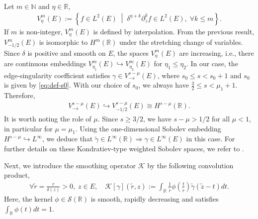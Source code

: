 ﻿\documentclass[11pt,reqno,oneside]{amsart}
\theoremstyle{definition}
\theoremstyle{remark}
\newcommand{\setdef}[2]{\left\lbrace {#1} \; \middle| \; {#2} \right\rbrace}
\newcommand{\R}{\mathbb{R}}
\newcommand{\N}{\mathbb{N}}
\newcommand{\Sw}{\mathcal{S}}
\renewcommand{\d}{\delta}
\newcommand{\g}{\gamma}
\newcommand{\vf}{\varphi}
\newcommand{\p}{\partial}
\newcommand{\ds}{\displaystyle}
\begin{document}
        Let $m\in\N$ and $\eta\in\R$,
        \begin{align*}
            V_{\eta}^m(E):=\setdef{f\in L^2(E)}{\d^{\eta+k}\p_z^k f \in L^2(E), \; \forall k\leq m}.
        \end{align*}
        If $m$ is non-integer, $V_{\eta}^m(E)$ is defined by interpolation. From the previous result, $V^m_{-1/2}(E)$ is isomorphic to $H^m(\R)$ under the stretching change of variables. Since $\d$ is positive and smooth on $E$, the spaces $V_{\eta}^m(E)$ are increasing, i.e., there are continuous embeddings $V_{\eta_1}^m(E)\hookrightarrow V_{\eta_2}^m(E)$ for $\eta_1\leq \eta_2$. In our case, the edge-singularity coefficient satisfies $\g\in V_{-s}^{s-\mu}(E)$, where $s_0\leq s <s_0+1$ and $s_0$ is given by \eqref{eq:def-s0}. With our choice of $s_0$, we always have $\frac{3}{2}\leq s < \mu_1+1$. Therefore,
        \begin{align}\label{eq:embedding-weighted}
                V_{-s}^{s-\mu}(E)\hookrightarrow V_{-1/2}^{s-\mu}(E) \cong H^{s-\mu}(\R).
        \end{align}
         It is worth noting the role of $\mu$. Since $s\geq 3/2$, we have $s-\mu> 1/2$ for all $\mu < 1$, in particular for $\mu=\mu_1$. Using the one-dimensional Sobolev embedding $H^{s-\mu}\hookrightarrow L^\infty$, we deduce that $\widetilde{\g}\in L^\infty(\R)\Rightarrow\g\in L^\infty(E)$ in this case. For further details on these Kondratiev-type weighted Sobolev spaces, we refer to \cite{Mazya2010}.

        Next, we introduce the smoothing operator $\mathcal{K}$ by the following convolution product,
        \begin{align*}
            \forall \widetilde{r}=\frac{r}{\d(z)}>0,\; z\in E,\quad \mathcal{K}[\g](\widetilde{r},z):=\int_{\R} \frac{1}{\widetilde{r}}\phi(\frac{t}{\widetilde{r}})\widetilde{\g}(\widetilde{z}-t)dt.%
        \end{align*}
        Here, the kernel $\phi\in\Sw(\R)$ is smooth, rapidly decreasing and satisfies $\ds \int_\R \phi(t) dt=1$.

        \medskip
\end{document}
